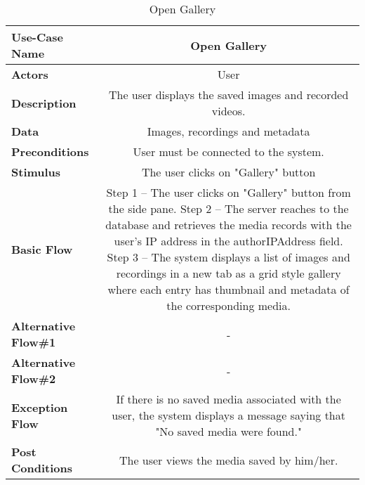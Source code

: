 \begin{table}[H]
     \centering
     \begin{tabular}{|l|C|}
         \hline
          \textbf{Use-Case Name} & Open Gallery \\
         \hline
          \textbf{Actors} & User \\ 
         \hline
          \textbf{Description} & The user displays the saved images and recorded videos. \\ 
         \hline
          \textbf{Data} & Images, recordings and metadata\\ 
         \hline
          \textbf{Preconditions} & 
          User must be connected to the system. \\
         \hline
          \textbf{Stimulus} & The user clicks on "Gallery" button \\ 
         \hline
          \textbf{Basic Flow} & 
          Step 1 -- The user clicks on "Gallery" button from the side pane. \newline
          Step 2 -- The server reaches to the database and retrieves the media records with the user's IP address in the authorIPAddress field.
          \newline
          Step 3 -- The system displays a list of images and recordings in a new tab as a grid style gallery where each entry has thumbnail and metadata of the corresponding media. \\
         \hline
          \textbf{Alternative Flow\#1} &  - \\ 
         \hline
          \textbf{Alternative Flow\#2} & -\\
         \hline
          \textbf{Exception Flow} & If there is no saved media associated with the user, the system displays a message saying that "No saved media were found."\\
         \hline
          \textbf{Post Conditions} & The user views the media saved by him/her. \\ 
         \hline
     \end{tabular}
     \caption{Open Gallery}
     \label{tab:open_gallery}
 \end{table}
